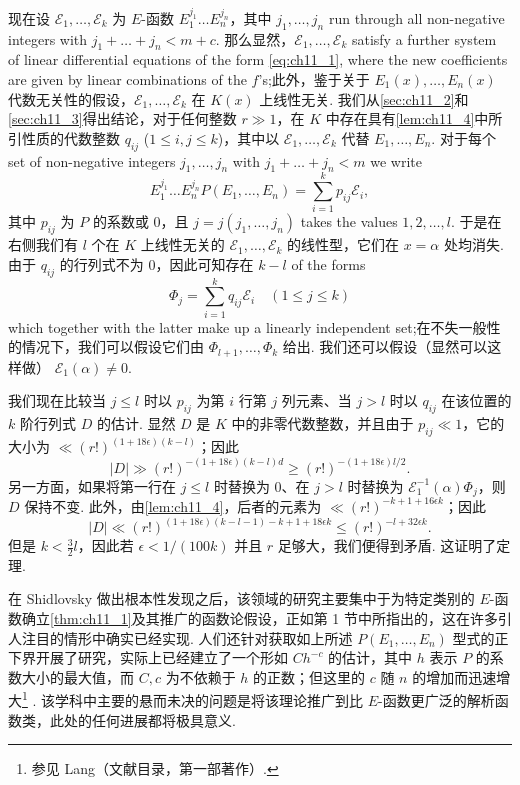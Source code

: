 现在设 $\mathscr{E}_1, \ldots, \mathscr{E}_k$ 为 $E$-函数 $E_1^{j_1} \dots E_n^{j_n}$，其中 $j_1, \ldots, j_n$ run through all non-negative integers with $j_1 + \ldots + j_n < m + c$. 那么显然，$\mathscr{E}_1, \ldots, \mathscr{E}_k$ satisfy a further system of linear differential equations of the form \eqref{eq:ch11_1}, where the new coefficients are given by linear combinations of the $f$'s;此外，鉴于关于 $E_1(x), \ldots, E_n(x)$ 代数无关性的假设，$\mathscr{E}_1, \ldots, \mathscr{E}_k$ 在 $K(x)$ 上线性无关. 我们从\autoref{sec:ch11_2}和\autoref{sec:ch11_3}得出结论，对于任何整数 $r \gg 1$，在 $K$ 中存在具有\autoref{lem:ch11_4}中所引性质的代数整数 $q_{ij}$ ($1 \le i, j \le k$)，其中以 $\mathscr{E}_1, \dots, \mathscr{E}_k$ 代替 $E_1, \dots, E_n$. 对于每个 set of non-negative integers $j_1, \dots, j_n$ with $j_1 + \ldots + j_n < m$ we write
\[E_1^{j_1} \dots E_n^{j_n} P(E_1, \dots, E_n) = \sum_{i=1}^k p_{ij} \mathscr{E}_i,\]
其中 $p_{ij}$ 为 $P$ 的系数或 0，且 $j = j(j_1, \ldots, j_n)$ takes the values $1, 2, \ldots, l$. 于是在右侧我们有 $l$ 个在 $K$ 上线性无关的 $\mathscr{E}_1, \dots, \mathscr{E}_k$ 的线性型，它们在 $x = \alpha$ 处均消失. 由于 $q_{ij}$ 的行列式不为 0，因此可知存在 $k - l$ of the forms
\[\Phi_j = \sum_{i=1}^k q_{ij} \mathscr{E}_i \quad (1 \leqslant j \leqslant k)\]
which together with the latter make up a linearly independent set;在不失一般性的情况下，我们可以假设它们由 $\Phi_{l+1}, \ldots, \Phi_k$ 给出. 我们还可以假设（显然可以这样做） $\mathscr{E}_1(\alpha) \neq 0$.

我们现在比较当 $j \le l$ 时以 $p_{ij}$ 为第 $i$ 行第 $j$ 列元素、当 $j > l$ 时以 $q_{ij}$ 在该位置的 $k$ 阶行列式 $D$ 的估计. 显然 $D$ 是 $K$ 中的非零代数整数，并且由于 $p_{ij} \ll 1$，它的大小为 $\ll (r!)^{(1+18\epsilon)(k-l)}$；因此
\[|D| \gg (r!)^{-(1+18\epsilon)(k-l)d} \geqslant (r!)^{-(1+18\epsilon)l/2}.\]
另一方面，如果将第一行在 $j \le l$ 时替换为 0、在 $j > l$ 时替换为 $\mathscr{E}_1^{-1}(\alpha)\Phi_j$，则 $D$ 保持不变. 此外，由\autoref{lem:ch11_4}，后者的元素为 $\ll (r!)^{-k+1+16\epsilon k}$；因此
\[|D| \ll (r!)^{(1+18\epsilon)(k-l-1)-k+1+18\epsilon k} \leqslant (r!)^{-l+32\epsilon k}.\]
但是 $k < \frac{3}{2} l$，因此若 $\epsilon < 1/(100k)$ 并且 $r$ 足够大，我们便得到矛盾. 这证明了定理.

在 Shidlovsky 做出根本性发现之后，该领域的研究主要集中于为特定类别的 $E$-函数确立\autoref{thm:ch11_1}及其推广的函数论假设，正如第 1 节中所指出的，这在许多引人注目的情形中确实已经实现. 人们还针对获取如上所述 $P(E_1, \ldots, E_n)$ 型式的正下界开展了研究，实际上已经建立了一个形如 $C h^{-c}$ 的估计，其中 $h$ 表示 $P$ 的系数大小的最大值，而 $C, c$ 为不依赖于 $h$ 的正数；但这里的 $c$ 随 $n$ 的增加而迅速增大\footnote{参见 Lang（文献目录，第一部著作）. } . 该学科中主要的悬而未决的问题是将该理论推广到比 $E$-函数更广泛的解析函数类，此处的任何进展都将极具意义.
